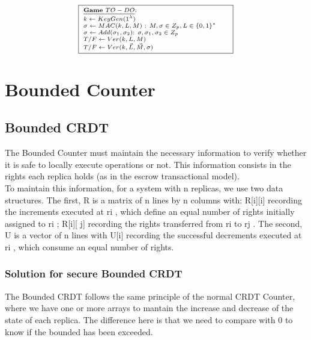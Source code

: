 \documentclass{article}
\begin{document}
\begin{equation}
 \centering \scriptsize
 \framebox{\setlength\tabcolsep{0pt}
       \begin{minipage}[t]{0.5\textwidth}  
       \underline{\bf Game $TO-DO$}: \\
	  $k \gets KeyGen(1^\lambda)$\\
	  $\sigma \gets MAC(k,L,M)$ : $M,\sigma\in Z_p,L\in\{0,1\}^*$ \\
	  $\sigma \gets Add(\sigma_1,\sigma_2)$: $\sigma,\sigma_1,\sigma_2\in Z_p$\\
	  $T/F \gets Ver(k,L,M)$\\
	  $T/F \gets Ver(k,\Vec{L},\Vec{M},\sigma)$
     \end{minipage}
}
  \label{fig.counterCRDT}
 \end{equation}
 


\newpage
\section{Bounded Counter}
\subsection{Bounded CRDT}
The Bounded Counter must maintain the necessary information to verify whether it is safe to locally execute operations or not. This information consists in
the rights each replica holds (as in the escrow transactional
model).
\\
To maintain this information, for a system with n replicas, we use two data structures. The first, R is a matrix of n lines by n columns with: R[i][i] recording the increments executed at ri , which define an equal number of rights initially assigned to ri ; R[i][ j] recording the rights transferred from ri to rj . The second, U is a vector of n lines with U[i] recording the successful decrements executed at ri , which consume an equal number of rights.

\subsubsection{Solution for secure Bounded CRDT}

The Bounded CRDT follows the same principle of the normal CRDT Counter, where we have one or more arrays to mantain the increase and decrease of the state of each replica. The difference here is that we need to compare with 0 to know if the bounded has been exceeded.\\
\end{document}

